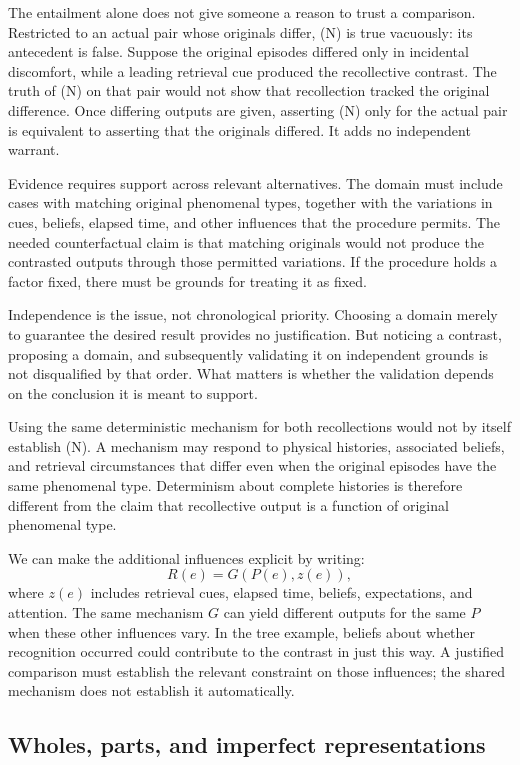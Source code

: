 The entailment alone does not give someone a reason to trust a comparison. Restricted to an actual pair whose originals differ, (N) is true vacuously: its antecedent is false. Suppose the original episodes differed only in incidental discomfort, while a leading retrieval cue produced the recollective contrast. The truth of (N) on that pair would not show that recollection tracked the original difference. Once differing outputs are given, asserting (N) only for the actual pair is equivalent to asserting that the originals differed. It adds no independent warrant.

Evidence requires support across relevant alternatives. The domain must include cases with matching original phenomenal types, together with the variations in cues, beliefs, elapsed time, and other influences that the procedure permits. The needed counterfactual claim is that matching originals would not produce the contrasted outputs through those permitted variations. If the procedure holds a factor fixed, there must be grounds for treating it as fixed.

Independence is the issue, not chronological priority. Choosing a domain merely to guarantee the desired result provides no justification. But noticing a contrast, proposing a domain, and subsequently validating it on independent grounds is not disqualified by that order. What matters is whether the validation depends on the conclusion it is meant to support.

Using the same deterministic mechanism for both recollections would not by itself establish (N). A mechanism may respond to physical histories, associated beliefs, and retrieval circumstances that differ even when the original episodes have the same phenomenal type. Determinism about complete histories is therefore different from the claim that recollective output is a function of original phenomenal type.

We can make the additional influences explicit by writing:
\[
R(e)=G(P(e),z(e)),
\]
where \(z(e)\) includes retrieval cues, elapsed time, beliefs, expectations, and attention. The same mechanism \(G\) can yield different outputs for the same \(P\) when these other influences vary. In the tree example, beliefs about whether recognition occurred could contribute to the contrast in just this way. A justified comparison must establish the relevant constraint on those influences; the shared mechanism does not establish it automatically.

\subsection*{Wholes, parts, and imperfect representations}

